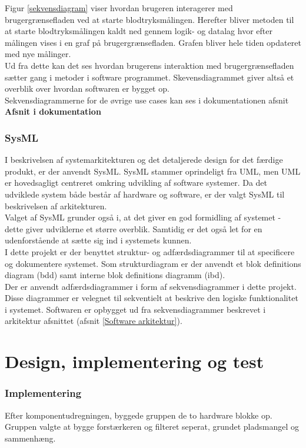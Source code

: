 Figur \ref{sekvensdiagram} viser hvordan brugeren interagerer med brugergrænsefladen ved at starte blodtryksmålingen. Herefter bliver metoden til at starte blodtryksmålingen kaldt ned gennem logik- og datalag hvor efter målingen vises i en graf på brugergrænsefladen. Grafen bliver hele tiden opdateret med nye målinger.\\
Ud fra dette kan det ses hvordan brugerens interaktion med brugergrænsefladen sætter gang i metoder i software programmet. Skevensdiagrammet giver altså et overblik over hvordan softwaren er bygget op.\\
Sekvensdiagrammerne for de øvrige use cases kan ses i dokumentationen afsnit \textbf{Afsnit i dokumentation}
  
 \subsection{SysML}
 I beskrivelsen af systemarkitekturen og det detaljerede design for det færdige produkt, er der anvendt SysML. SysML stammer oprindeligt fra UML, men UML er hovedsagligt centreret omkring udvikling af software systemer. Da det udviklede system både består af hardware og software, er der valgt SysML til beskrivelsen af arkitekturen.\\
Valget af SysML grunder også i, at det giver en god formidling af systemet - dette giver udviklerne et større overblik. Samtidig er det også let for en udenforstående at sætte sig ind i systemets kunnen.\\

I dette projekt er der benyttet struktur- og adfærdsdiagrammer til at specificere og dokumentere systemet. Som strukturdiagram er der anvendt et blok definitions diagram (bdd) samt interne blok definitions diagramm (ibd).\\
Der er anvendt adfærdsdiagrammer i form af sekvensdiagrammer i dette projekt. Disse diagrammer er velegnet til sekventielt at beskrive den logiske funktionalitet i systemet. Softwaren er opbygget ud fra sekvensdiagrammer beskrevet i arkitektur afsnittet (afsnit \ref{Software arkitektur}).

\chapter{Design, implementering og test}


\subsection{Implementering}
Efter komponentudregningen, byggede gruppen de to hardware blokke op. Gruppen valgte at bygge forstærkeren og filteret seperat, grundet pladsmangel og sammenhæng.\\

